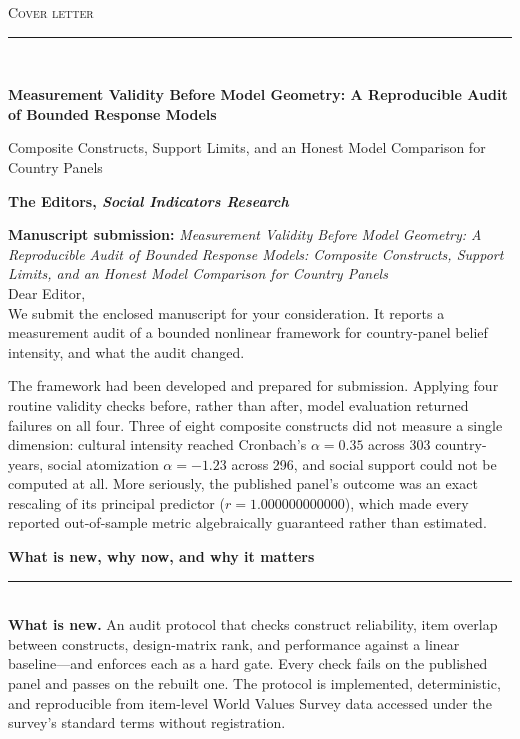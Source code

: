\documentclass[11pt]{article}
\newcommand{\ManuscriptTitle}{Measurement Validity Before Model Geometry: A Reproducible Audit of Bounded Response Models}
\newcommand{\ManuscriptSubtitle}{Composite Constructs, Support Limits, and an Honest Model Comparison for Country Panels}
\newcommand{\EditorLine}{The Editors, \emph{Social Indicators Research}}
\newcommand{\SubRule}{{\color{black!65}\rule{\linewidth}{0.4pt}}}
\newcommand{\SmallHeading}[1]{\needspace{5\baselineskip}\vspace{0.85em}\noindent\textbf{#1}\\[-0.25em]\SubRule\\[0.45em]}
\begin{document}
\thispagestyle{empty}
\begingroup
{}
\RaggedRight
\setlength{\parindent}{0pt}

{\small\textsc{Cover letter}}\\[-0.35em]
{\color{black!65}\rule{\linewidth}{0.6pt}}\\[0.8em]

\begin{center}
	{\LARGE\bfseries \ManuscriptTitle\par}
	\vspace{0.35em}
	{\large \ManuscriptSubtitle\par}
\end{center}

\vspace{0.55em}

\footnotesize

\noindent \textbf{\EditorLine}\par
\vspace{0.9em}

\noindent \textbf{Manuscript submission:} \emph{\ManuscriptTitle: \ManuscriptSubtitle}\\[0.7em]

\noindent Dear Editor,\\[0.35em]

\noindent We submit the enclosed manuscript for your consideration. It reports a measurement audit of a bounded nonlinear framework for country-panel belief intensity, and what the audit changed.

\noindent The framework had been developed and prepared for submission. Applying four routine validity checks before, rather than after, model evaluation returned failures on all four. Three of eight composite constructs did not measure a single dimension: cultural intensity reached Cronbach's $\alpha=0.35$ across 303 country-years, social atomization $\alpha=-1.23$ across 296, and social support could not be computed at all. More seriously, the published panel's outcome was an exact rescaling of its principal predictor ($r=1.000000000000$), which made every reported out-of-sample metric algebraically guaranteed rather than estimated.

\SmallHeading{What is new, why now, and why it matters}

\noindent \textbf{What is new.} An audit protocol that checks construct reliability, item overlap between constructs, design-matrix rank, and performance against a linear baseline---and enforces each as a hard gate. Every check fails on the published panel and passes on the rebuilt one. The protocol is implemented, deterministic, and reproducible from item-level World Values Survey data accessed under the survey's standard terms without registration.
\end{document}
